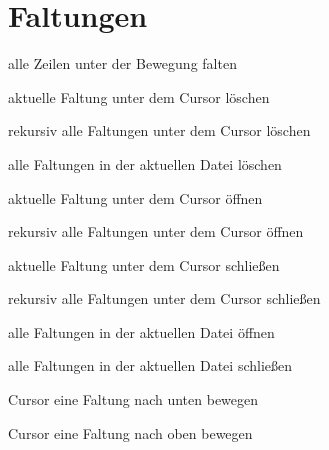\documentclass
[
  draft    = true,
  fontsize = 11pt,
  parskip  = half,
  BCOR     = 0pt,
  DIV      = calc,
  ngerman
]
{scrartcl}
\begin{document}
\section{Faltungen}
\begin{mytemize}
  \item {} alle Zeilen unter der Bewegung  falten
  \item {}  aktuelle Faltung unter dem Cursor löschen
  \item {}  rekursiv alle Faltungen unter dem Cursor löschen 
  \item {}  alle Faltungen in der aktuellen Datei löschen
  \item {}  aktuelle Faltung unter dem Cursor öffnen
  \item {}  rekursiv alle Faltungen unter dem Cursor öffnen
  \item {}  aktuelle Faltung unter dem Cursor schließen
  \item {}  rekursiv alle Faltungen unter dem Cursor schließen
  \item {}  alle Faltungen in der aktuellen Datei öffnen
  \item {}  alle Faltungen in der aktuellen Datei schließen
  \item {}  Cursor eine Faltung nach unten bewegen
  \item {}  Cursor eine Faltung nach oben bewegen
\end{mytemize}

\end{document}
